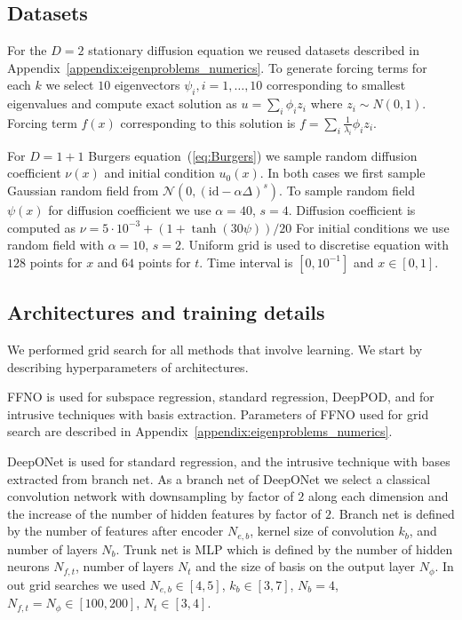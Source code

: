 \documentclass{article}
\begin{document}
\subsection{Datasets}
\label{appendix:subsection:PDEs_datasets}
For the $D=2$ stationary diffusion equation we reused datasets described in Appendix~\ref{appendix:eigenproblems_numerics}. To generate forcing terms for each $k$ we select $10$ eigenvectors $\psi_i, i=1,\dots, 10$ corresponding to smallest eigenvalues and compute exact solution as $u = \sum_i \phi_i z_i$ where $z_i \sim N(0, 1)$. Forcing term $f(x)$ corresponding to this solution is $f = \sum_i \frac{1}{\lambda_i}\phi_i z_i$.

For $D=1+1$ Burgers equation~(\ref{eq:Burgers}) we sample random diffusion coefficient $\nu(x)$ and initial condition $u_0(x)$. In both cases we first sample Gaussian random field from $\mathcal{N}\left(0, \left(\text{id} - \alpha \Delta\right)^s\right)$. To sample random field $\psi(x)$ for diffusion coefficient we use $\alpha = 40$, $s = 4$. Diffusion coefficient is computed as $\nu = 5\cdot 10^{-3} + (1 + \tanh(30 \psi)) / 20$ For initial conditions we use random field with $\alpha = 10$, $s = 2$. Uniform grid is used to discretise equation with $128$ points for $x$ and $64$ points for $t$. Time interval is $\left[0, 10^{-1}\right]$ and $x\in[0, 1]$.

\subsection{Architectures and training details}
We performed grid search for all methods that involve learning. We start by describing hyperparameters of architectures.

FFNO is used for subspace regression, standard regression, DeepPOD, and for intrusive techniques with basis extraction. Parameters of FFNO used for grid search are described in Appendix~\ref{appendix:eigenproblems_numerics}.

DeepONet is used for standard regression, and the intrusive technique with bases extracted from branch net. As a branch net of DeepONet we select a classical convolution network with downsampling by factor of $2$ along each dimension and the increase of the number of hidden features by factor of $2$. Branch net is defined by the number of features after encoder $N_{e, b}$, kernel size of convolution $k_{b}$, and number of layers $N_{b}$. Trunk net is MLP which is defined by the number of hidden neurons $N_{f, t}$, number of layers $N_{t}$ and the size of basis on the output layer $N_{\phi}$. In out grid searches we used $N_{e, b} \in [4, 5]$, $k_{b}\in[3, 7]$, $N_b = 4$, $N_{f, t} = N_{\phi} \in [100, 200]$, $N_t \in [3, 4]$.
\end{document}
